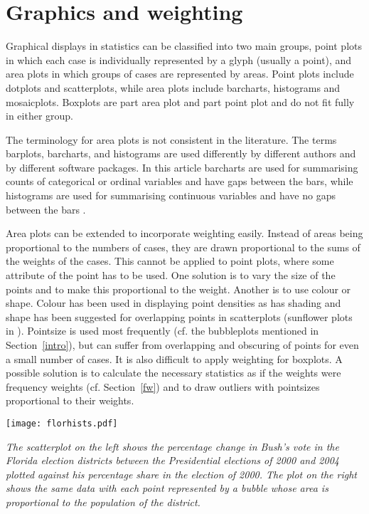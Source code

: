 \documentclass{svmult}
\begin{document}
\section{Graphics and weighting}
\label{gwts}
Graphical displays in statistics can be classified into two main groups, point plots in which each case is individually represented by a glyph (usually a point), and area plots in which groups of cases are represented by areas.  Point plots include dotplots and scatterplots, while area plots include barcharts, histograms and mosaicplots.  Boxplots are part area plot and part point plot and do not fit fully in either group.

The terminology for area plots is not consistent in the literature.  The terms barplots, barcharts, and histograms are used differently by different authors and by different software packages.  In this article barcharts are used for summarising counts of categorical or ordinal variables and have gaps between the bars, while histograms are used for summarising continuous variables and have no gaps between the bars \citep{unwin:2006}.
 
Area plots can be extended to incorporate weighting easily.  Instead of areas being proportional to the numbers of cases, they are drawn proportional to the sums of the weights of the cases.  This cannot be applied to point plots, where some attribute of the point has to be used.  One solution is to vary the size of the points and to make this proportional to the weight.  Another is to use colour or shape.  Colour has been used in displaying point densities \citep{carr:1987} as has shading \citep{hofmann:2000a} and shape has been suggested for overlapping points in scatterplots (sunflower plots in \cite{cleveland:1984}).  Pointsize is used most frequently (cf. the bubbleplots mentioned in Section~\ref{intro}), but can suffer from overlapping and obscuring of points for even a small number of cases.  It is also difficult to apply weighting for boxplots.  A possible solution is to calculate the necessary statistics as if the weights were frequency weights (cf. Section~\ref{fw}) and to draw outliers with pointsizes proportional to their weights.

\begin{center}
      \texttt{[image: florhists.pdf]}
      \caption{\label{bubflor}\em The scatterplot on the left shows the percentage change in Bush's vote in the Florida election districts between the Presidential elections of 2000 and 2004 plotted against his percentage share in the election of 2000.  The plot on the right shows the same data with each point represented by a bubble whose area is proportional to the population of the district.}
      \end{center}
      
\end{document}
